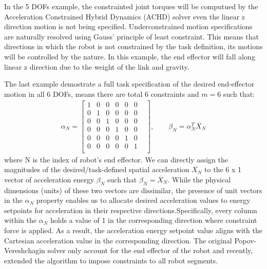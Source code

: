 \documentclass[report.tex]{subfiles}
\begin{document}
    In the 5 DOFs example, the constrainted joint torques will be computued by the Acceleration Constrained Hybrid Dynamics (ACHD) solver even the linear z direction motion is not being specified. Underconstrained motion specifications are naturally resolved using Gauss' principle of least constraint. This means that directions in which the robot is not constrained by the task definition, its motions will be controlled by the nature. In this example, the end effector will fall along linear z direction due to the weight of the link and gravity.

    The last example demostrate a full task specification of the desired end-effector motion in all 6 DOFs, means there are total 6 constraints and $m = 6$ such that:
    \begin{align}
        \alpha_N = \begin{bmatrix}
            1&0&0&0&0&0&\\
            0&1&0&0&0&0&\\
            0&0&1&0&0&0&\\
            0&0&0&1&0&0&\\
            0&0&0&0&1&0&\\
            0&0&0&0&0&1&\\ 
        \end{bmatrix} ,\qquad
        \beta_N = \alpha_N^T \ddot{X_N}
    \end{align}
    where N is the index of robot's end effector. We can directly assign  the magnitudes of the desired/task-defined spatial acceleration $\ddot{X_N}$ to the 6 x 1 vector of acceleration energy $\beta_N$ such that $\beta_N =  \ddot{X_N}$. While the physical dimensions (units) of these two vectors are dissimilar, the presence of unit vectors in the $\alpha_N$ property enables us to allocate desired acceleration values to energy setpoints for acceleration in their respective directions.Specifically, every column within the $\alpha_N$ holds a value of 1 in the corresponding direction where constraint force is applied. As a result, the acceleration energy setpoint value aligns with the Cartesian acceleration value in the corresponding direction.
    The original Popov-Vereshchagin solver only account for the end effector of the robot and recently,\cite{shakhimardanov2015composable} extended the algorithm to impose constraints to all robot segments.
\end{document}

